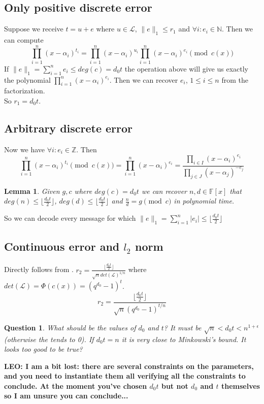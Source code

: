 \documentclass[12pt]{article}
\newcommand{\floor}[1]{\lfloor #1 \rfloor}
\newtheorem{question}{Question}
\newtheorem{lemma}{Lemma}
\begin{document}
\subsection{Only positive discrete error}
Suppose we receive $t = u + e$ where $u \in \mathcal{L}$, $\|e\|_1 \leq r_1$ and $\forall i: e_i \in \mathbb{N}$. Then we can compute
\[
\prod_{i = 1}^{n}(x - \alpha_i)^{t_i} = \prod_{i = 1}^{n}(x - \alpha_i)^{u_i}\prod_{i = 1}^{n}(x - \alpha_i)^{e_i} \pmod{c(x)}
\]
If $\|e\|_1 = \sum_{i =1}^{n} e_i \leq deg(c) = d_0t$ the operation above will give us exactly the polynomial $\prod_{i = 1}^{n}(x - \alpha_i)^{e_i}$. Then we can recover $e_i$, $1 \leq i \leq n$ from the factorization.\\
So $r_1 = d_0t$.
\subsection{Arbitrary discrete error}
Now we have $\forall i: e_i \in \mathbb{Z}$. Then
\[
\prod_{i = 1}^{n}(x - \alpha_i)^{t_i} \pmod{c(x)} = \prod_{i = 1}^{n}(x - \alpha_i)^{e_i} = \frac{\prod_{i \in I}(x - \alpha_i)^{e_i}}{\prod_{j \in J}(x - \alpha_j)^{-e_j}}
\]
\begin{lemma}
Given $g,c$ where $deg(c) = d_0t$ we can recover $n, d \in \mathbb{F}[x]$ that $deg(n) \leq \floor{\frac{d_0t}{2}}$, $deg(d) \leq \floor{\frac{d_0t}{2}}$ and $\frac{n}{d} = g \pmod{c}$ in polynomial time.
\end{lemma}
So we can decode every message for which $\|e\|_1 = \sum_{i =1}^{n} |e_i| \leq \floor{\frac{d_0t}{2}}$

\subsection{Continuous error and $l_2$ norm}
Directly follows from \cite{[DP19]}. $r_2 = \frac{\floor{\frac{d_0t}{2}}}{\sqrt{n} det(\mathcal{L})^{1/n}}$ where $det(\mathcal{L}) = \Phi(c(x)) = (q^{d_0} - 1)^{t}$.
\[
r_2 = \frac{\floor{\frac{d_0t}{2}}}{\sqrt{n} (q^{d_0} - 1)^{t/n}}
\]
\begin{question}
What should be the values of $d_0$ and $t$? It must be $\sqrt{n} < d_0t < n^{1+\epsilon}$(otherwise the tends to 0). If $d_0t = n$ it is very close to Minkowski's bound. It looks too good to be true?
\end{question}
{\bf LEO: I am a bit lost: there are several constraints on the parameters, and you need to instantiate them all verifying all the constraints to conclude. At the moment you've chosen $d_0t$ but not $d_0$ and $t$ themselves so I am unsure you can conclude...}



\end{document}

